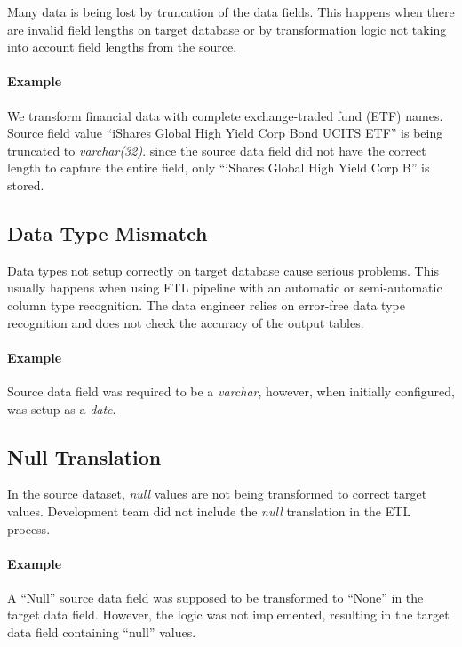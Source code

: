 Many data is being lost by truncation of the data fields.
This happens when there are invalid field lengths on target database or by transformation logic not taking into account field lengths from the source.

\paragraph*{Example} We transform financial data with complete exchange-traded fund (ETF) names.
Source field value \enquote{iShares Global High Yield Corp Bond UCITS ETF} is being truncated to \textit{varchar(32)}.
since the source data field did not have the correct length to capture the entire field, only \enquote{iShares Global High Yield Corp B} is stored.

\subsection*{Data Type Mismatch}

Data types not setup correctly on target database cause serious problems.
This usually happens when using ETL pipeline with an automatic or semi-automatic column type recognition.
The data engineer relies on error-free data type recognition and does not check the accuracy of the output tables.

\paragraph*{Example} Source data field was required to be a \textit{varchar}, however, when initially configured, was setup as a \textit{date}.

\subsection*{Null Translation}

In the source dataset, \textit{null} values are not being transformed to correct target values.
Development team did not include the \textit{null} translation in the ETL process.

\paragraph*{Example} A \enquote{Null} source data field was supposed to be transformed to \enquote{None} in the target data field.
However, the logic was not implemented, resulting in the target data field containing \enquote{null} values\footnotemark.

